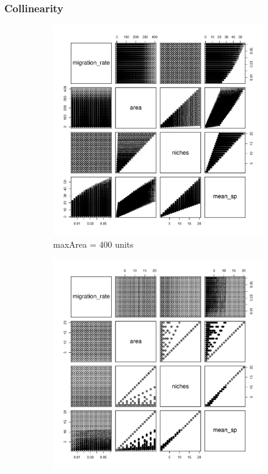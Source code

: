 \documentclass{article}
\begin{document}
\subsubsection{Collinearity}

\begin{figure}[!h]
  \centering
  \begin{subfigure}[b]{0.4\linewidth}
    \includegraphics[width=\linewidth]{../../../Results/Simulation2/CollinearityPlot_1.pdf}
    \caption{maxArea = 400 units}
  \end{subfigure}
  \begin{subfigure}[b]{0.4\linewidth}
    \includegraphics[width=\linewidth]{../../../Results/Simulation2/CollinearityPlot_20.pdf}

\end{subfigure}
\end{figure}
\end{document}
